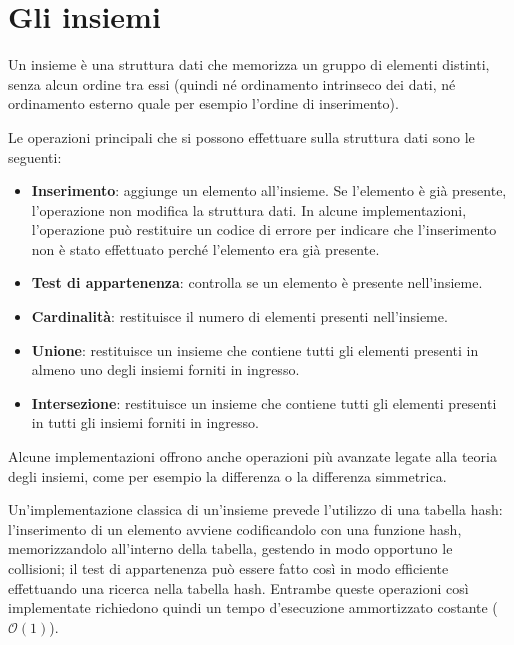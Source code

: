 \section{Gli insiemi}

Un insieme è una struttura dati che memorizza un gruppo di elementi distinti, senza alcun ordine tra
essi (quindi né ordinamento intrinseco dei dati, né ordinamento esterno quale per esempio l'ordine
di inserimento).

Le operazioni principali che si possono effettuare sulla struttura dati sono le seguenti:

\begin{itemize}
	\item \textbf{Inserimento}: aggiunge un elemento all'insieme. Se l'elemento è già presente,
	l'operazione non modifica la struttura dati. In alcune implementazioni, l'operazione può 
	restituire un codice di errore per indicare che l'inserimento non è stato effettuato
	perché l'elemento era già presente.

	\item \textbf{Test di appartenenza}: controlla se un elemento è presente nell'in\-sie\-me.

	\item \textbf{Cardinalità}: restituisce il numero di elementi presenti nell'in\-sie\-me.

	\item \textbf{Unione}: restituisce un insieme che contiene tutti gli elementi presenti in almeno
	uno degli insiemi forniti in ingresso.

	\item \textbf{Intersezione}: restituisce un insieme che contiene tutti gli e\-le\-men\-ti
	presenti in tutti gli insiemi forniti in ingresso.
\end{itemize}

Alcune implementazioni offrono anche operazioni più avanzate legate alla teoria degli insiemi,
come per esempio la differenza o la differenza simmetrica. 

Un'implementazione classica di un'insieme prevede l'utilizzo di una tabella hash: l'inserimento
di un elemento avviene codificandolo con una funzione hash, memorizzandolo all'interno della
tabella, gestendo in modo opportuno le collisioni; il test di appartenenza può essere fatto così in
modo efficiente effettuando una ricerca nella tabella hash. Entrambe queste operazioni così 
implementate richiedono quindi un tempo d'esecuzione ammortizzato costante ($\mathcal{O}(1)$).

